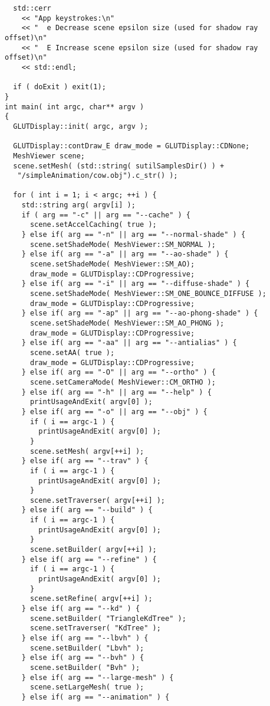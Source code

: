 \begin{verbatim}
  std::cerr
    << "App keystrokes:\n"
    << "  e Decrease scene epsilon size (used for shadow ray offset)\n"
    << "  E Increase scene epsilon size (used for shadow ray offset)\n"
    << std::endl;

  if ( doExit ) exit(1);
}
int main( int argc, char** argv ) 
{
  GLUTDisplay::init( argc, argv );
  
  GLUTDisplay::contDraw_E draw_mode = GLUTDisplay::CDNone; 
  MeshViewer scene;
  scene.setMesh( (std::string( sutilSamplesDir() ) +
   "/simpleAnimation/cow.obj").c_str() );

  for ( int i = 1; i < argc; ++i ) {
    std::string arg( argv[i] );
    if ( arg == "-c" || arg == "--cache" ) {
      scene.setAccelCaching( true );
    } else if( arg == "-n" || arg == "--normal-shade" ) {
      scene.setShadeMode( MeshViewer::SM_NORMAL );
    } else if( arg == "-a" || arg == "--ao-shade" ) {
      scene.setShadeMode( MeshViewer::SM_AO);
      draw_mode = GLUTDisplay::CDProgressive;
    } else if( arg == "-i" || arg == "--diffuse-shade" ) {
      scene.setShadeMode( MeshViewer::SM_ONE_BOUNCE_DIFFUSE );
      draw_mode = GLUTDisplay::CDProgressive;
    } else if( arg == "-ap" || arg == "--ao-phong-shade" ) {
      scene.setShadeMode( MeshViewer::SM_AO_PHONG );
      draw_mode = GLUTDisplay::CDProgressive;
    } else if( arg == "-aa" || arg == "--antialias" ) {
      scene.setAA( true );
      draw_mode = GLUTDisplay::CDProgressive;
    } else if( arg == "-O" || arg == "--ortho" ) {
      scene.setCameraMode( MeshViewer::CM_ORTHO );
    } else if( arg == "-h" || arg == "--help" ) {
      printUsageAndExit( argv[0] ); 
    } else if( arg == "-o" || arg == "--obj" ) {
      if ( i == argc-1 ) {
        printUsageAndExit( argv[0] );
      }
      scene.setMesh( argv[++i] );
    } else if( arg == "--trav" ) {
      if ( i == argc-1 ) {
        printUsageAndExit( argv[0] );
      }
      scene.setTraverser( argv[++i] );
    } else if( arg == "--build" ) {
      if ( i == argc-1 ) {
        printUsageAndExit( argv[0] );
      }
      scene.setBuilder( argv[++i] );
    } else if( arg == "--refine" ) {
      if ( i == argc-1 ) {
        printUsageAndExit( argv[0] );
      }
      scene.setRefine( argv[++i] );
    } else if( arg == "--kd" ) {  
      scene.setBuilder( "TriangleKdTree" );
      scene.setTraverser( "KdTree" );
    } else if( arg == "--lbvh" ) { 
      scene.setBuilder( "Lbvh" );
    } else if( arg == "--bvh" ) {
      scene.setBuilder( "Bvh" );
    } else if( arg == "--large-mesh" ) {
      scene.setLargeMesh( true );
    } else if( arg == "--animation" ) {

\end{verbatim}
